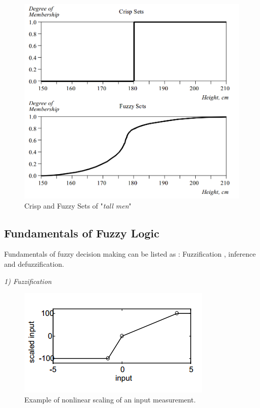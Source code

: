 \begin{figure}[ht]
    \centering
    \includegraphics[scale=.3]{Images/crisp_and_fuzzy.png}
    \caption{Crisp and Fuzzy Sets of "\textit{tall men}"}
    \label{fig:comparison}
\end{figure}

\subsection{Fundamentals of Fuzzy Logic} 

Fundamentals of fuzzy decision making can be listed as : Fuzzification , inference and defuzzification.



\textit{1) Fuzzification}


\begin{figure}[ht]
    \centering
    \includegraphics[scale=.55]{Images/fuzzification.png}
    \caption{Example of nonlinear scaling of an input measurement. \cite{jantzen} }
    \label{fig:fig_fuzzification_jantzen}
\end{figure}


